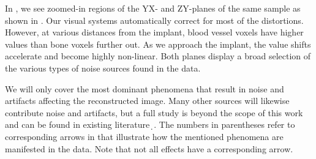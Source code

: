 In , we see zoomed-in regions of the YX- and ZY-planes of the
same sample as shown in .  Our visual systems
automatically correct for most of the distortions. However, at various
distances from the implant, blood vessel voxels have higher values than bone
voxels further out. As we approach the implant, the value shifts accelerate and
become highly non-linear.  Both planes display a broad selection of the various
types of noise sources found in the data.

We will only cover the most dominant phenomena that result in noise and
artifacts affecting the reconstructed image. Many other sources will likewise
contribute noise and artifacts, but a full study is beyond the scope of this
work and can be found in existing
literature~̣\citep{noise_and_artifacts_1,noise_and_artifacts_2}. The numbers in
parentheses refer to corresponding arrows in  that illustrate
how the mentioned phenomena are manifested in the data. Note that not all
effects have a corresponding arrow.

